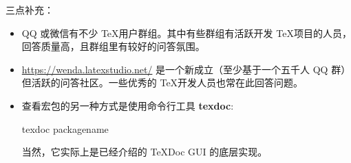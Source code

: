 三点补充：
\begin{itemize}
\item QQ 或微信有不少 \TeX 用户群组。其中有些群组有活跃开发 \TeX 项目的人员，回答质量高，且群组里有较好的问答氛围。
\item \url{https://wenda.latexstudio.net/} 是一个新成立（至少基于一个五千人 QQ 群）但活跃的问答社区。一些优秀的 \TeX 开发人员也常在此回答问题。
\item 查看宏包的另一种方式是使用命令行工具 \textbf{texdoc}:
\begin{texlst}
texdoc packagename
\end{texlst}
当然，它实际上是已经介绍的 TeXDoc GUI 的底层实现。
\end{itemize}